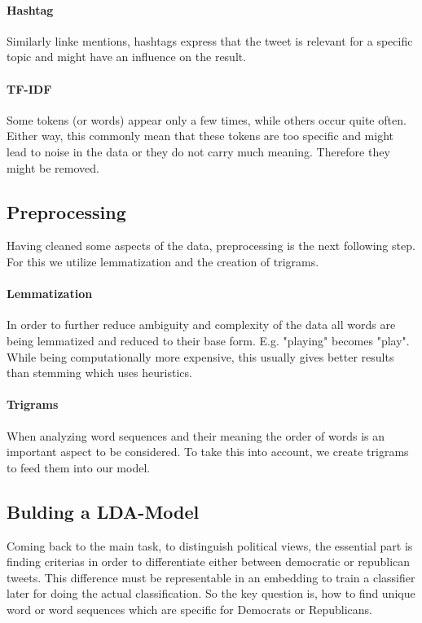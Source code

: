 \documentclass[sigconf, nonacm]{acmart}
\begin{document}
\paragraph{Hashtag} Similarly linke mentions, hashtags express that the tweet is relevant for a specific topic and might have an influence on the result.

\paragraph{TF-IDF} Some tokens (or words) appear only a few times, while others occur quite often. Either way, this commonly mean that these tokens are too specific and might lead to noise in the data or they do not carry much meaning. Therefore they might be removed.

\subsection{Preprocessing}
\label{subsec:process}
Having cleaned some aspects of the data, preprocessing is the next following step. For this we utilize lemmatization and the creation of trigrams.

\paragraph{Lemmatization} In order to further reduce ambiguity and complexity of the data all words are being lemmatized and reduced to their base form. E.g. "playing" becomes "play". While being computationally more expensive, this usually gives better results than stemming which uses heuristics.

\paragraph{Trigrams} When analyzing word sequences and their meaning the order of words is an important aspect to be considered. To take this into account, we create trigrams to feed them into our model.

\subsection{Bulding a LDA-Model}
\label{subsec:lda}
Coming back to the main task, to distinguish political views, the essential part is finding criterias in order to differentiate either between democratic or republican tweets. This difference must be representable in an embedding to train a classifier later for doing the actual classification. So the key question is, how to find unique word or word sequences which are specific for Democrats or Republicans.
\end{document}
